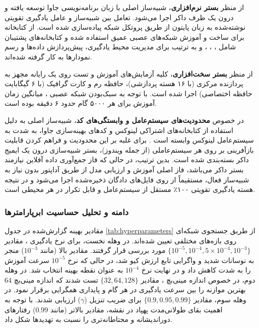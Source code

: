\documentclass[oneside,openany,a4paper,12pt,draft]{article}
\begin{document}
از منظر \textbf{بستر نرم‌افزاری}، شبیه‌ساز اصلی با زبان برنامه‌نویسی جاوا  توسعه یافته و درون یک ظرف داکر  اجرا می‌شود. تعامل بین شبیه‌ساز و عامل یادگیری تقویتی نوشته‌شده به زبان پایتون  از طریق پروتکل شبکه  پیاده‌سازی شده است. از کتابخانه  برای ساخت و آموزش شبکه‌های عصبی عمیق استفاده شده و کتابخانه‌های پشتیبان شامل ، ، ،  و  به ترتیب برای مدیریت محیط یادگیری، پیش‌پردازش داده‌ها و رسم نمودارها به کار گرفته شده‌اند.

از منظر \textbf{بستر سخت‌افزاری}، کلیه آزمایش‌های آموزش و تست روی یک رایانه مجهز به پردازنده مرکزی  (با ۱۶ هسته پردازشی)، حافظه رم  و کارت گرافیک  (با ۶ گیگابایت حافظه اختصاصی) اجرا شده است. با توجه به سبک‌بودن شبکه عصبی ، میانگین زمان آموزش برای هر ۵۰۰۰ گام حدود ۶ دقیقه بوده است.

در خصوص \textbf{محدودیت‌های سیستم‌عامل و وابستگی‌های کد}، شبیه‌ساز اصلی  به دلیل استفاده از کتابخانه‌های اشتراکی لینوکس  و کدهای بهینه‌سازی جاوا، به شدت به سیستم‌عامل لینوکس وابسته است . برای غلبه بر این محدودیت و فراهم کردن قابلیت بازآفرینی بر روی هر سیستم‌عاملی (از جمله ویندوز)، بستر شبیه‌سازی درون یک ایمیج داکر  بسته‌بندی شده است. بدین ترتیب، در حالی که فاز جمع‌آوری داده آفلاین نیازمند بستر داکر می‌باشد، فاز اصلی آموزش و ارزیابی مدل از طریق آداپتور  بدون نیاز به شبیه‌ساز فعال، مستقیماً از روی فایل‌های دادگان  ذخیره‌شده اجرا می‌شود و در نتیجه هسته یادگیری تقویتی ۱۰۰٪ مستقل از سیستم‌عامل و قابل تکرار در هر محیطی است.

\subsubsection{دامنه و تحلیل حساسیت ابرپارامترها}
مقادیر بهینه گزارش‌شده در جدول \ref{tab:hyperparameters} از طریق جستجوی شبکه‌ای  روی بازه‌های مختلفی تعیین شده‌اند. در وهله نخست، برای نرخ یادگیری ، مقادیر \mbox{$\{10^{-5}, 10^{-4}, 5 \times 10^{-4}, 10^{-3}\}$} مورد بررسی قرار گرفتند. مقادیر بالا (مانند $10^{-3}$) منجر به نوسانات شدید و واگرایی تابع ارزش کیو شد، در حالی که نرخ $10^{-5}$ سرعت آموزش را به شدت کاهش داد و در نهایت نرخ $10^{-4}$ به عنوان نقطه بهینه انتخاب شد. در وهله دوم، در خصوص اندازه مینی‌بچ ، مقادیر \mbox{$\{32, 64, 128\}$} تست شدند که اندازه مینی‌بچ $64$ بهترین موازنه را بین سرعت یادگیری در هر گام و پایداری همگرایی برقرار نمود. در وهله سوم، مقادیر \mbox{$\{0.9, 0.95, 0.99\}$} برای ضریب تنزیل ($\gamma$) ارزیابی شدند. با توجه به اهمیت بقای طولانی‌مدت پهپاد در نقشه، مقادیر بالاتر (مانند $0.99$) رفتارهای دوراندیشانه و محتاطانه‌تری را نسبت به تهدیدها شکل داد.
\end{document}
